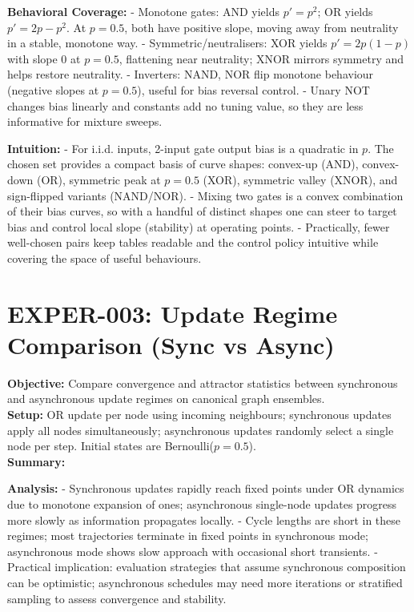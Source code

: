 \documentclass{article}
\begin{document}
\textbf{Behavioral Coverage:}
- Monotone gates: AND yields $p' = p^2$; OR yields $p' = 2p - p^2$. At $p=0.5$, both have positive slope, moving away from neutrality in a stable, monotone way.
- Symmetric/neutralisers: XOR yields $p' = 2p(1-p)$ with slope $0$ at $p=0.5$, flattening near neutrality; XNOR mirrors symmetry and helps restore neutrality.
- Inverters: NAND, NOR flip monotone behaviour (negative slopes at $p=0.5$), useful for bias reversal control.
- Unary NOT changes bias linearly and constants add no tuning value, so they are less informative for mixture sweeps.

\textbf{Intuition:}
- For i.i.d. inputs, 2-input gate output bias is a quadratic in $p$. The chosen set provides a compact basis of curve shapes: convex-up (AND), convex-down (OR), symmetric peak at $p=0.5$ (XOR), symmetric valley (XNOR), and sign-flipped variants (NAND/NOR).
- Mixing two gates is a convex combination of their bias curves, so with a handful of distinct shapes one can steer to target bias and control local slope (stability) at operating points.
- Practically, fewer well-chosen pairs keep tables readable and the control policy intuitive while covering the space of useful behaviours.




\section{EXPER-003: Update Regime Comparison (Sync vs Async)}
\textbf{Objective:} Compare convergence and attractor statistics between synchronous and asynchronous update regimes on canonical graph ensembles.\\
\textbf{Setup:} OR update per node using incoming neighbours; synchronous updates apply all nodes simultaneously; asynchronous updates randomly select a single node per step. Initial states are Bernoulli($p=0.5$).\\
\textbf{Summary:}\\
\begin{center}
\end{center}
\textbf{Analysis:}
- Synchronous updates rapidly reach fixed points under OR dynamics due to monotone expansion of ones; asynchronous single-node updates progress more slowly as information propagates locally.
- Cycle lengths are short in these regimes; most trajectories terminate in fixed points in synchronous mode; asynchronous mode shows slow approach with occasional short transients.
- Practical implication: evaluation strategies that assume synchronous composition can be optimistic; asynchronous schedules may need more iterations or stratified sampling to assess convergence and stability.
\end{document}

